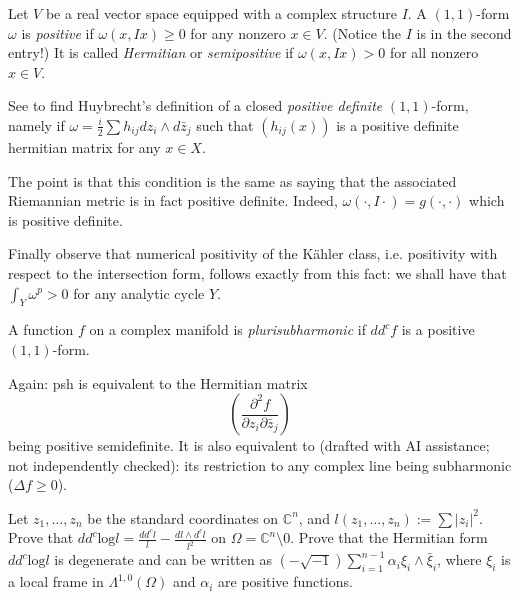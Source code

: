 \begin{definition}
\label{definition-positive-11form}
Let $V$ be a real vector space equipped with
a complex structure $I$.
A $(1,1)$-form $\omega$ is {\it positive}
if $\omega(x,Ix)\geq 0$ for any nonzero $x
\in V$.
(Notice the $I$ is in the second entry!)
It is called {\it Hermitian} or {\it
semipositive}
if $\omega(x,Ix)>0$ for all nonzero $x \in
V$.
\end{definition}

\noindent
See \cite[Lemma 3.1.7]{huc}
to find Huybrecht's definition of a closed
{\it positive definite}
$(1,1)$-form, namely if
$\omega=\frac{i}{2}\sum h_{ij}dz_i \wedge
d\bar{z}_j$
such that $(h_{ij}(x))$ is a positive
definite hermitian matrix for any $x \in X$.

The point is that this condition
is the same as saying that the associated
Riemannian metric is in fact positive
definite.
Indeed, $\omega(\cdot,I\cdot)=g(\cdot,\cdot)$
which is positive definite.

Finally observe that numerical positivity of
the
Kähler class,
i.e. positivity with respect to the
intersection form,
follows exactly from this fact: we shall have
that
$\int_Y \omega^p>0$ for any analytic cycle
$Y$.

\begin{definition}
\label{definition-psh}
A function $f$ on a complex manifold is
{\it plurisubharmonic} if $dd^cf$ is
a positive $(1,1)$-form.
\end{definition}

\noindent
Again: psh is equivalent to the Hermitian
matrix
$$
\left(\frac{\partial^2 f}{\partial
z_i\partial \bar{z}_j}\right)
$$
being positive semidefinite.
It is also equivalent to
(drafted with AI assistance; not independently checked): its
restriction to
any complex line being subharmonic ($\Delta
f\geq 0$).

\begin{exercise}
\label{exercise-logl}
Let $z_1,…,z_n$ be the standard coordinates
on $\mathbb{C}^n$,
and $l(z_1,…,z_n):=\sum|z_i|^2$.
Prove that
$dd^c\text{log}l=\frac{dd^cl}{l}-\frac{dl
\wedge d^cl}{l^2}$
on $\Omega=\mathbb{C}^n\setminus 0$.
Prove that the Hermitian form $dd^c
\text{log} l$
is degenerate and can be written as
$(-\sqrt{-1})\sum_{i=1}^{n-1}
\alpha_i\xi_i\wedge \bar{\xi}_i$,
where $\xi_i$ is a local frame in
$\Lambda^{1,0}(\Omega)$
and $\alpha_i$ are positive functions.
\end{exercise}

